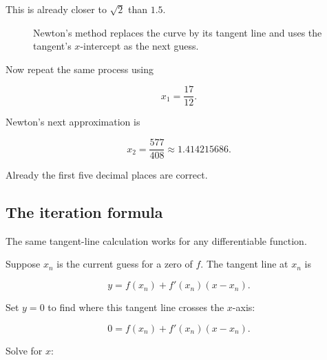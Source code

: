 This is already closer to \(\sqrt2\) than \(1.5\).

\begin{figure}[h]
\centering
{}
\caption{Newton's method replaces the curve by its tangent line and uses the tangent's \(x\)-intercept as the next guess.}
\label{fig:newton-sqrt2-first-step}
\end{figure}

Now repeat the same process using

\[
x_1=\frac{17}{12}.
\]

Newton's next approximation is

\[
x_2
=
\frac{577}{408}
\approx
1.414215686.
\]

Already the first five decimal places are correct.

\subsection{The iteration formula}
\label{subsec:newton-iteration-formula}

The same tangent-line calculation works for any differentiable function.

Suppose \(x_n\) is the current guess for a zero of \(f\).  The tangent line at \(x_n\) is

\[
y=f(x_n)+f'(x_n)(x-x_n).
\]

Set \(y=0\) to find where this tangent line crosses the \(x\)-axis:

\[
0=f(x_n)+f'(x_n)(x-x_n).
\]

Solve for \(x\):

